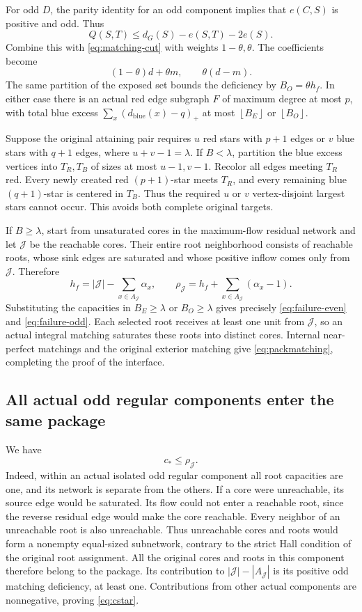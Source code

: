 \documentclass[11pt,a4paper]{article}
\newcommand{\floor}[1]{\left\lfloor#1\right\rfloor}
\theoremstyle{definition}
\begin{document}
For odd $D$, the parity identity for an odd component implies that $e(C,S)$ is positive and odd. Thus
\[
Q(S,T)\le d_G(S)-e(S,T)-2e(S).
\]
Combine this with \eqref{eq:matching-cut} with weights $1-\theta,\theta$. The coefficients become
\[
(1-\theta)d+\theta m,\qquad \theta(d-m).
\]
The same partition of the exposed set bounds the deficiency by $B_O=\theta h_f$. In either case there is an actual red edge subgraph $F$ of maximum degree at most $p$, with total blue excess $\sum_x(d_{\mathrm{blue}}(x)-q)_+$ at most $\floor{B_E}$ or $\floor{B_O}$.

Suppose the original attaining pair requires $u$ red stars with $p+1$ edges or $v$ blue stars with $q+1$ edges, where $u+v-1=\lambda$. If $B<\lambda$, partition the blue excess vertices into $T_R,T_B$ of sizes at most $u-1,v-1$. Recolor all edges meeting $T_R$ red. Every newly created red $(p+1)$-star meets $T_R$, and every remaining blue $(q+1)$-star is centered in $T_B$. Thus the required $u$ or $v$ vertex-disjoint largest stars cannot occur. This avoids both complete original targets.

If $B\ge\lambda$, start from unsaturated cores in the maximum-flow residual network and let $\mathcal J$ be the reachable cores. Their entire root neighborhood consists of reachable roots, whose sink edges are saturated and whose positive inflow comes only from $\mathcal J$. Therefore
\[
h_f=|\mathcal J|-\sum_{x\in A_{\mathcal J}}\alpha_x,\qquad
\rho_{\mathcal J}=h_f+\sum_{x\in A_{\mathcal J}}(\alpha_x-1).
\]
Substituting the capacities in $B_E\ge\lambda$ or $B_O\ge\lambda$ gives precisely \eqref{eq:failure-even} and \eqref{eq:failure-odd}. Each selected root receives at least one unit from $\mathcal J$, so an actual integral matching saturates these roots into distinct cores. Internal near-perfect matchings and the original exterior matching give \eqref{eq:packmatching}, completing the proof of the interface.

\subsection{All actual odd regular components enter the same package}
We have
\begin{equation}\label{eq:cstar}
c_*\le\rho_{\mathcal J}.
\end{equation}
Indeed, within an actual isolated odd regular component all root capacities are one, and its network is separate from the others. If a core were unreachable, its source edge would be saturated. Its flow could not enter a reachable root, since the reverse residual edge would make the core reachable. Every neighbor of an unreachable root is also unreachable. Thus unreachable cores and roots would form a nonempty equal-sized subnetwork, contrary to the strict Hall condition of the original root assignment. All the original cores and roots in this component therefore belong to the package. Its contribution to $|\mathcal J|-|A_{\mathcal J}|$ is its positive odd matching deficiency, at least one. Contributions from other actual components are nonnegative, proving \eqref{eq:cstar}.
\end{document}
